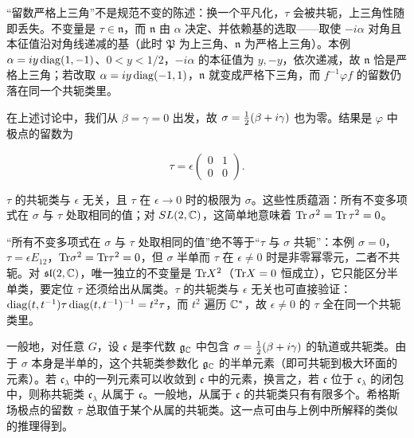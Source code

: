 \begin{yizhu}[易错点]
“留数严格上三角”不是规范不变的陈述：换一个平凡化，$\tau$ 会被共轭，上三角性随即丢失。不变量是 $\tau\in\mathfrak n$，而 $\mathfrak n$ 由 $\alpha$ 决定、并依赖基的选取——取使 $-i\alpha$ 对角且本征值沿对角线递减的基（此时 $\mathfrak P$ 为上三角、$\mathfrak n$ 为严格上三角）。本例 $\alpha=iy\,{\rm diag}(1,-1)$、$0<y<1/2$，$-i\alpha$ 的本征值为 $y,-y$，依次递减，故 $\mathfrak n$ 恰是严格上三角；若改取 $\alpha=iy\,{\rm diag}(-1,1)$，$\mathfrak n$ 就变成严格下三角，而 $f^{-1}\varphi f$ 的留数仍落在同一个共轭类里。
\end{yizhu}

在上述讨论中，我们从 $\beta=\gamma=0$ 出发，故 $\sigma={1\over 2}(\beta+i\gamma)$
也为零。结果是 $\varphi$ 中极点的留数为

\setcounter{equation}{23}
\begin{equation}\label{eq:3.24}
  \tau=\epsilon\left(\begin{matrix}0 & 1\\ 0 & 0 \end{matrix}\right).
\end{equation}

$\tau$ 的共轭类与 $\epsilon$ 无关，且 $\tau$ 在
$\epsilon\to 0$ 时的极限为 $\sigma$。这些性质蕴涵：所有不变多项式在 $\sigma$ 与 $\tau$ 处取相同的值；对 $SL(2,{\mathbb{C}})$，这简单地意味着 ${\rm Tr}\,\sigma^2=
{\rm Tr}\,\tau^2=0$。

\begin{yizhu}[易错点]
“所有不变多项式在 $\sigma$ 与 $\tau$ 处取相同的值”绝不等于“$\tau$ 与 $\sigma$ 共轭”：本例 $\sigma=0$，$\tau=\epsilon E_{12}$，${\rm Tr}\sigma^2={\rm Tr}\tau^2=0$，但 $\sigma$ 半单而 $\tau$ 在 $\epsilon\not=0$ 时是非零幂零元，二者不共轭。对 $\mathfrak{sl}(2,{\mathbb{C}})$，唯一独立的不变量是 ${\rm Tr} X^2$（${\rm Tr} X=0$ 恒成立），它只能区分半单类，要定位 $\tau$ 还须给出从属类。$\tau$ 的共轭类与 $\epsilon$ 无关也可直接验证：${\rm diag}(t,t^{-1})\tau\,{\rm diag}(t,t^{-1})^{-1}=t^2\tau$，而 $t^2$ 遍历 ${\mathbb{C}}^*$，故 $\epsilon\not=0$ 的 $\tau$ 全在同一个共轭类里。
\end{yizhu}

一般地，对任意 $G$，设 $\mathfrak c$ 是李代数 $\mathfrak g_{\mathbb{C}}$ 中包含 $\sigma={1\over
2}(\beta+i\gamma)$ 的轨道或共轭类。由于 $\sigma$ 本身是半单的，这个共轭类参数化 $\mathfrak g_{\mathbb{C}}$ 的半单元素（即可共轭到极大环面的元素）。若 $\mathfrak c_\lambda$ 中的一列元素可以收敛到 $\mathfrak c$ 中的元素，换言之，若 $\mathfrak c$
位于 $\mathfrak c_\lambda$ 的闭包中，则称共轭类 ${\mathfrak c}_\lambda$ 从属于 $\mathfrak c$。一般地，从属于 $\mathfrak c$ 的共轭类只有有限多个。希格斯场极点的留数 $\tau$ 总取值于某个从属的共轭类。这一点可由与上例中所解释的类似的推理得到。


